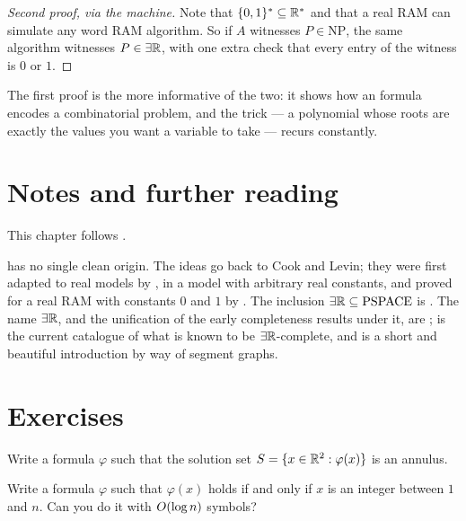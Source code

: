 \begin{proof}[Second proof, via the machine]
Note that $\{0,1\}^{*} \subseteq \mathbb{R}^{*}$ and that a real RAM can simulate any
word RAM algorithm. So if $A$ witnesses $P \in \mathrm{NP}$, the same algorithm
witnesses $P \in \exists\mathbb{R}$, with one extra check that every entry of the witness is
$0$ or $1$.
\end{proof}

The first proof is the more informative of the two: it shows how an \ETR{}
formula encodes a combinatorial problem, and the trick --- a polynomial whose
roots are exactly the values you want a variable to take --- recurs constantly.

\section{Notes and further reading}
\label{sec:etr-further-reading}

This chapter follows \citet{Miltzow2026}.

 has no single clean origin. The ideas go back to
Cook and Levin; they were first adapted to real models by
\citet{BlumCuckerShubSmale1998}, in a model with arbitrary real constants, and
proved for a real RAM with constants $0$ and $1$ by
\citet{EricksonVanDerHoogMiltzow2024}. The inclusion
$\exists\mathbb{R} \subseteq \mathrm{PSPACE}$ is \citet{Canny1988}. The name $\exists\mathbb{R}$, and the
unification of the early completeness results under it, are
\citet{Schaefer2010}; \citet{SchaeferCardinalMiltzow2024} is the current
catalogue of what is known to be $\exists\mathbb{R}$-complete, and
\citet{Matousek2014} is a short and beautiful introduction by way of segment
graphs.

\section{Exercises}
\label{sec:ex-etr}

\begin{exercise}
Write a formula $\varphi$ such that the solution set
$S = \{x \in \mathbb{R}^2 : \varphi(x)\}$ is an annulus.
\end{exercise}

\begin{exercise}
Write a formula $\varphi$ such that $\varphi(x)$ holds if and only if $x$ is an
integer between $1$ and $n$. Can you do it with $O\!\left(\log n\right)$ symbols?
\end{exercise}

